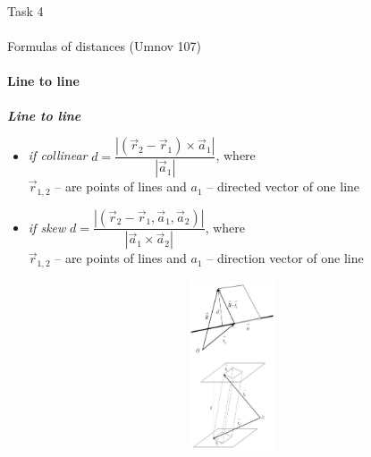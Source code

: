 \documentclass[aspectratio=169]{beamer}
\begin{document}
\begin{frame}[t]{Task 4}
    \framesubtitle{}
\end{frame}

\begin{frame}[t]{Formulas of distances (Umnov 107)}
    \framesubtitle{Line to line}
    \begin{minipage}{0.6\textwidth}
        \textbf{\textit{Line to line}}\begin{itemize}
            \item \textit{if collinear} $d = \dfrac{|(\vec{r}_2-\vec{r}_1) \times \vec{a}_1| }{|\vec{a}_1|}$, where \\ $\vec{r}_{1,2}$ -- are points of lines and $a_1$ -- directed vector of one line
            \item \textit{if skew} $d = \dfrac{|(\vec{r}_2-\vec{r}_1,\vec{a}_1,\vec{a}_2)| }{|\vec{a}_1\times\vec{a}_2|}$, where \\ $\vec{r}_{1,2}$ -- are points of lines and $a_1$ -- direction vector of one line
        \end{itemize}
    \end{minipage}
    \begin{minipage}{0.39\textwidth}
        \begin{figure}[H]
            \centering\includegraphics[height=5cm,width=1\textwidth,keepaspectratio]{distance_2.png}
            \label{fig:distance_2.png}
        \end{figure}
    \end{minipage}
\end{frame}
\end{document}

